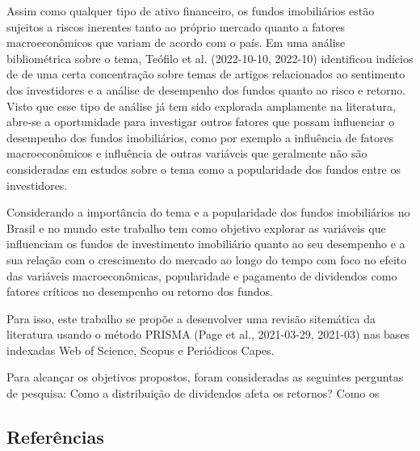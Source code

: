 \documentclass[
  12pt,
  letterpaper,
  DIV=11,
  numbers=noendperiod]{scrartcl}
\begin{document}
Assim como qualquer tipo de ativo financeiro, os fundos imobiliários
estão sujeitos a riscos inerentes tanto ao próprio mercado quanto a
fatores macroeconômicos que variam de acordo com o país. Em uma análise
bibliométrica sobre o tema, Teófilo et al. (2022-10-10, 2022-10)
identificou indícios de de uma certa concentração sobre temas de artigos
relacionados ao sentimento dos investidores e a análise de desempenho
dos fundos quanto ao risco e retorno. Visto que esse tipo de análise já
tem sido explorada amplamente na literatura, abre-se a oportunidade para
investigar outros fatores que possam influenciar o desempenho dos fundos
imobiliários, como por exemplo a influência de fatores macroeconômicos e
influência de outras variáveis que geralmente não são consideradas em
estudos sobre o tema como a popularidade dos fundos entre os
investidores.

Considerando a importância do tema e a popularidade dos fundos
imobiliários no Brasil e no mundo este trabalho tem como objetivo
explorar as variáveis que influenciam os fundos de investimento
imobiliário quanto ao seu desempenho e a sua relação com o crescimento
do mercado ao longo do tempo com foco no efeito das variáveis
macroeconômicas, popularidade e pagamento de dividendos como fatores
críticos no desempenho ou retorno dos fundos.

Para isso, este trabalho se propõe a desenvolver uma revisão sitemática
da literatura usando o método PRISMA (Page et al., 2021-03-29, 2021-03)
nas bases indexadas Web of Science, Scopus e Periódicos Capes.

Para alcançar os objetivos propostos, foram consideradas as seguintes
perguntas de pesquisa: Como a distribuição de dividendos afeta os
retornos? Como os

\subsection*{Referências}\label{referuxeancias}
\end{document}
